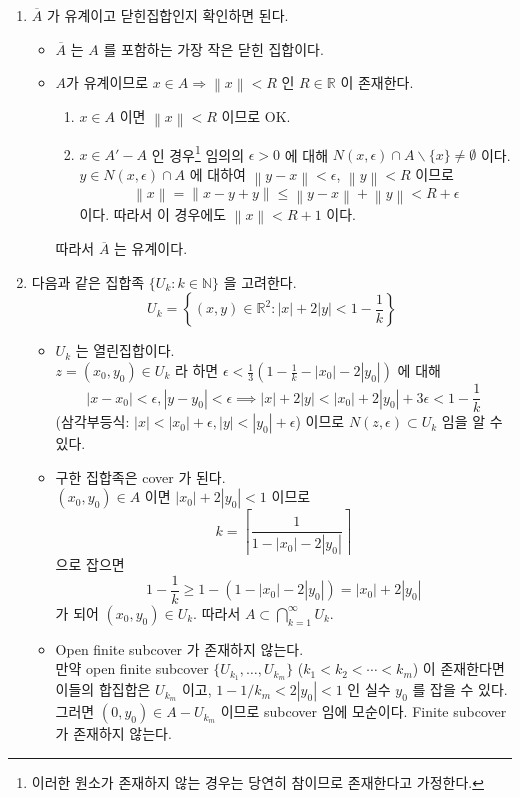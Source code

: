 \documentclass[12pt]{report}
\newcommand{\numl}[1]{\item[\large\textbf{\sffamily #1.}]}
\newcommand{\norm}[1]{\left\lVert#1\right\rVert}
\newcommand{\Ra}{\Rightarrow}
\newcommand{\abs}[1]{\left|#1\right|}
\newcommand{\imp}{\implies}
\newcommand{\bs}{\backslash}
\newcommand{\R}{\mathbb{R}}
\newcommand{\N}{\mathbb{N}}
\begin{document}
\begin{enumerate}
\numl{4} $\overline{A}$ 가 유계이고 닫힌집합인지 확인하면 된다.
\begin{itemize}
	\item $\overline{A}$ 는 $A$ 를 포함하는 가장 작은 닫힌 집합이다.
	\item $A$가 유계이므로 $x\in A \Ra \norm{x}<R$ 인 $R\in\R$ 이 존재한다.
	\begin{enumerate}
		\item $x\in A$ 이면 $\norm{x}<R$ 이므로 OK.
		\item $x\in A' - A$ 인 경우\footnote{이러한 원소가 존재하지 않는 경우는 당연히 참이므로 존재한다고 가정한다.} 임의의 $\epsilon > 0$ 에 대해 $N(x, \epsilon) \cap A\bs \{x\} \neq \emptyset$ 이다. $y\in N(x, \epsilon) \cap A$ 에 대하여 $\norm{y-x} < \epsilon$, $\norm{y}<R$ 이므로
		$$\norm{x} = \norm{x-y+y} \leq \norm{y-x}+\norm{y} <R + \epsilon$$
		이다. 따라서 이 경우에도 $\norm{x} < R + 1$ 이다.
	\end{enumerate}
	따라서 $\overline{A}$ 는 유계이다.
\end{itemize}

\numl{5} 다음과 같은 집합족 $\{U_k: k\in\N\}$ 을 고려한다.
$$U_k = \left\{(x, y)\in \R^2: \abs{x}+2\abs{y} < 1-\frac{1}{k} \right\}$$
\begin{itemize}
	\item $U_k$ 는 열린집합이다.\\
	$z = (x_0, y_0) \in U_k$ 라 하면 $\epsilon < \frac{1}{3}(1-\frac{1}{k}-\abs{x_0}-2\abs{y_0})$ 에 대해
	$$\abs{x - x_0} <\epsilon, \abs{y-y_0}<\epsilon \imp \abs{x}+2\abs{y} < \abs{x_0} + 2\abs{y_0} + 3\epsilon < 1 - \frac{1}{k}$$
	(삼각부등식: $\abs{x} < \abs{x_0}+\epsilon, \abs{y} < \abs{y_0}+\epsilon$) 이므로 $N(z, \epsilon) \subset U_k$ 임을 알 수 있다.
	\item 구한 집합족은 cover 가 된다.\\
	$(x_0, y_0)\in A$ 이면 $\abs{x_0} + 2\abs{y_0} < 1$ 이므로  $$k = \left\lceil \frac{1}{1 -\abs{x_0} - 2\abs{y_0}}\right\rceil$$ 으로 잡으면 $$1-\frac{1}{k} \geq 1 - (1 -\abs{x_0} - 2\abs{y_0}) = \abs{x_0} + 2\abs{y_0}$$ 가 되어 $(x_0, y_0)\in U_k$. 따라서 $A \subset \bigcap_{k = 1}^\infty U_k$.	
	\item Open finite subcover 가 존재하지 않는다.\\
	만약 open finite subcover $\{U_{k_1}, \dots, U_{k_m} \}$ ($k_1<k_2<\cdots<k_m$) 이 존재한다면 이들의 합집합은 $U_{k_m}$ 이고, $1 - 1/k_m < 2\abs{y_0} < 1$ 인 실수 $y_0$ 를 잡을 수 있다. 그러면 $(0, y_0) \in A - U_{k_m}$ 이므로 subcover 임에 모순이다. Finite subcover 가 존재하지 않는다.
\end{itemize}


\end{enumerate}
\end{document}
